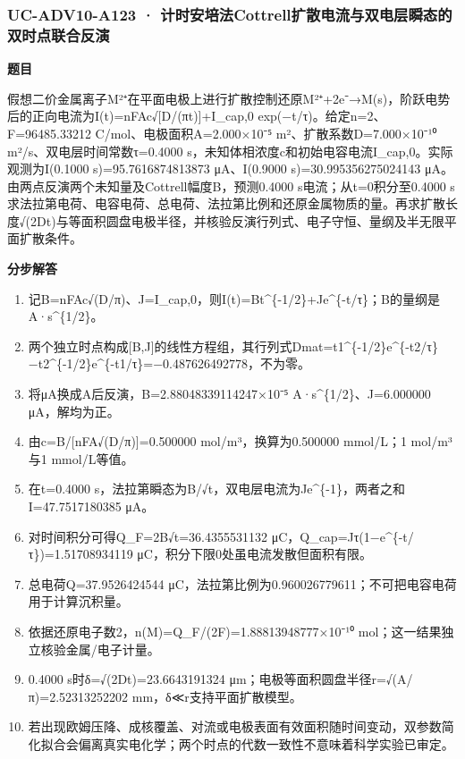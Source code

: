 \documentclass[UTF8,11pt,a4paper]{ctexart}
\begin{document}
\subsubsection*{UC-ADV10-A123 · 计时安培法Cottrell扩散电流与双电层瞬态的双时点联合反演}
\noindent\textbf{题目}\par
假想二价金属离子M²⁺在平面电极上进行扩散控制还原M²⁺+2e⁻→M(s)，阶跃电势后的正向电流为I(t)=nFAc√[D/(πt)]+I\_cap,0 exp(−t/τ)。给定n=2、F=96485.33212 C/mol、电极面积A=2.000×10⁻⁵ m²、扩散系数D=7.000×10⁻¹⁰ m²/s、双电层时间常数τ=0.4000 s，未知体相浓度c和初始电容电流I\_cap,0。实际观测为I(0.1000 s)=95.7616874813873 μA、I(0.9000 s)=30.995356275024143 μA。由两点反演两个未知量及Cottrell幅度B，预测0.4000 s电流；从t=0积分至0.4000 s求法拉第电荷、电容电荷、总电荷、法拉第比例和还原金属物质的量。再求扩散长度√(2Dt)与等面积圆盘电极半径，并核验反演行列式、电子守恒、量纲及半无限平面扩散条件。\par
\medskip\noindent\textbf{分步解答}
\begin{enumerate}
\item 记B=nFAc√(D/π)、J=I\_cap,0，则I(t)=Bt\textasciicircum{}\{-1/2\}+Je\textasciicircum{}\{-t/τ\}；B的量纲是A·s\textasciicircum{}\{1/2\}。
\item 两个独立时点构成[B,J]的线性方程组，其行列式Dmat=t1\textasciicircum{}\{-1/2\}e\textasciicircum{}\{-t2/τ\}−t2\textasciicircum{}\{-1/2\}e\textasciicircum{}\{-t1/τ\}=−0.487626492778，不为零。
\item 将μA换成A后反演，B=2.88048339114247×10⁻⁵ A·s\textasciicircum{}\{1/2\}、J=6.000000 μA，解均为正。
\item 由c=B/[nFA√(D/π)]=0.500000 mol/m³，换算为0.500000 mmol/L；1 mol/m³与1 mmol/L等值。
\item 在t=0.4000 s，法拉第瞬态为B/√t，双电层电流为Je\textasciicircum{}\{-1\}，两者之和I=47.7517180385 μA。
\item 对时间积分可得Q\_F=2B√t=36.4355531132 μC，Q\_cap=Jτ(1−e\textasciicircum{}\{-t/τ\})=1.51708934119 μC，积分下限0处虽电流发散但面积有限。
\item 总电荷Q=37.9526424544 μC，法拉第比例为0.960026779611；不可把电容电荷用于计算沉积量。
\item 依据还原电子数2，n(M)=Q\_F/(2F)=1.88813948777×10⁻¹⁰ mol；这一结果独立核验金属/电子计量。
\item 0.4000 s时δ=√(2Dt)=23.6643191324 μm；电极等面积圆盘半径r=√(A/π)=2.52313252202 mm，δ≪r支持平面扩散模型。
\item 若出现欧姆压降、成核覆盖、对流或电极表面有效面积随时间变动，双参数简化拟合会偏离真实电化学；两个时点的代数一致性不意味着科学实验已审定。
\end{enumerate}
\end{document}
